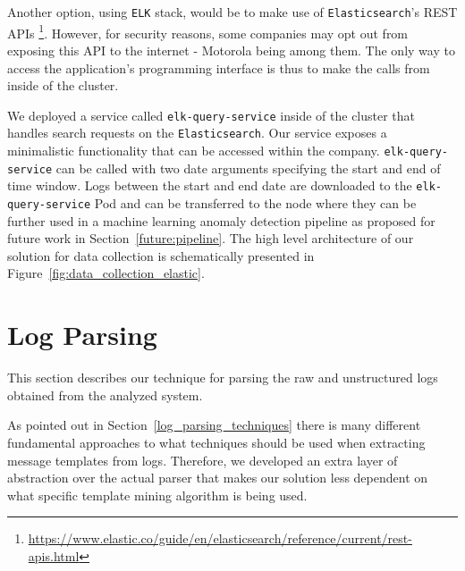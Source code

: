 Another option, using \texttt{ELK} stack, would be to make use of \texttt{Elasticsearch}'s REST APIs \footnote{\url{https://www.elastic.co/guide/en/elasticsearch/reference/current/rest-apis.html}}. However, for security reasons, some companies may opt out from exposing this API to the internet - Motorola being among them.
The only way to access the application's programming interface is thus to make the calls from inside of the cluster.

We deployed a service called \texttt{elk-query-service} inside of the cluster that handles search requests on the \texttt{Elasticsearch}. Our service exposes a minimalistic functionality that can be accessed within the company.
\texttt{\justify elk-query-service} can be called with two date arguments specifying the start and end of time window. Logs between the start and end date are downloaded to the \texttt{elk-query-service} Pod and can be transferred to the node where they can be further used in a machine learning anomaly detection pipeline as proposed for future work in Section~\ref{future:pipeline}. The high level architecture of our solution for data collection is schematically presented in Figure~\ref{fig:data_collection_elastic}.

\begin{figure}[!tbp] 
\end{figure}

\newpage

\section{Log Parsing}
This section describes our technique for parsing the raw and unstructured logs obtained from the analyzed system.

As pointed out in Section~\ref{log_parsing_techniques} there is many different fundamental approaches to what techniques should be used when extracting message templates from logs. 
Therefore, we developed an extra layer of abstraction over the actual parser that makes our solution less dependent on what specific template mining algorithm is being used.

